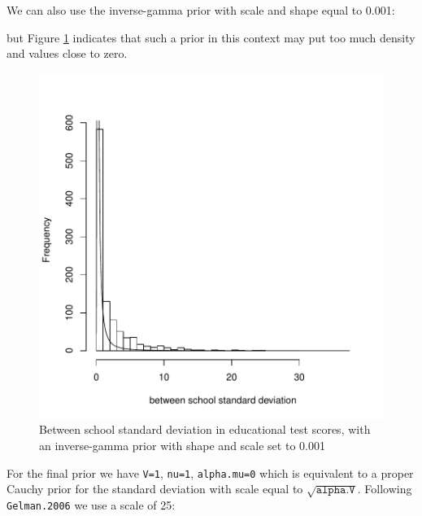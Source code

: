 \documentclass{article}
\begin{document}
We can also use the inverse-gamma prior with scale and shape equal to 0.001:

\begin{Schunk}
\end{Schunk}

but Figure \ref{school2-fig} indicates that such a prior in this context may put too much density and values close to zero.\\


\begin{figure}[!h]
\begin{center}
\includegraphics{Lecture8-015}
\end{center}
\caption{Between school standard deviation in educational test scores, with an inverse-gamma prior with shape and scale set to 0.001}
\label{school2-fig}
\end{figure}


For the final prior we have \texttt{V=1}, \texttt{nu=1}, \texttt{alpha.mu=0} which is equivalent to a proper Cauchy prior for the standard deviation with scale equal to $$. Following \texttt{Gelman.2006} we use a scale of 25: 
\end{document}
